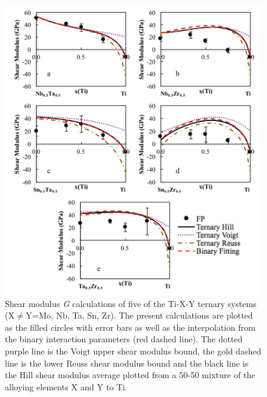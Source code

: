 \pagebreak
\begin{figure}[H]
	\centering
	\includegraphics[width=\textwidth]{Chapter-6/Figures/tixyshear2.png}
	\caption{Shear modulus \textit{G} calculations of five of the Ti-X-Y ternary systems (X$\neq$Y=Mo, Nb, Ta, Sn, Zr). The present calculations are plotted as the filled circles with error bars as well as the interpolation from the binary interaction parameters (red dashed line). The dotted purple line is the Voigt upper shear modulus bound, the gold dashed line is the lower Reuss shear modulus bound and the black line is the Hill shear modulus average plotted from a 50-50 mixture of the alloying elements X and Y to Ti.}
	\label{Ch6-figure:tixyshear2}
\end{figure}

